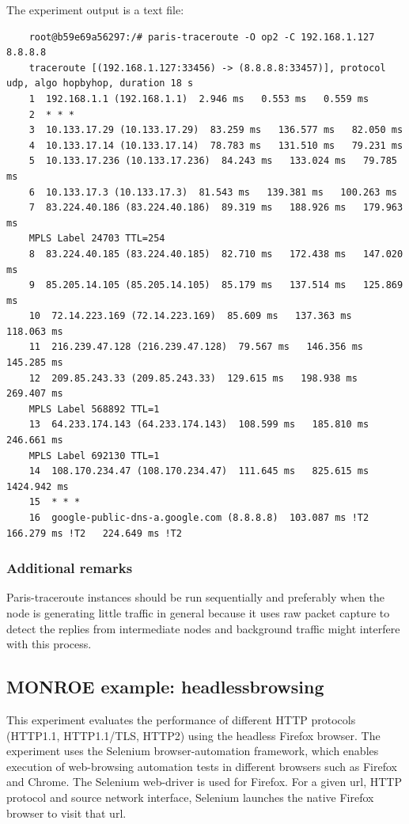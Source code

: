 \documentclass[a4paper,10pt]{article}
\newcommand{\VerbatimFont}{\footnotesize}
\newcommand{\monroe}{MONROE}
\begin{document}
The experiment output is a text file:

{\VerbatimFont
	\begin{verbatim}
	root@b59e69a56297:/# paris-traceroute -O op2 -C 192.168.1.127 8.8.8.8
	traceroute [(192.168.1.127:33456) -> (8.8.8.8:33457)], protocol udp, algo hopbyhop, duration 18 s
	1  192.168.1.1 (192.168.1.1)  2.946 ms   0.553 ms   0.559 ms 
	2  * * *
	3  10.133.17.29 (10.133.17.29)  83.259 ms   136.577 ms   82.050 ms 
	4  10.133.17.14 (10.133.17.14)  78.783 ms   131.510 ms   79.231 ms 
	5  10.133.17.236 (10.133.17.236)  84.243 ms   133.024 ms   79.785 ms 
	6  10.133.17.3 (10.133.17.3)  81.543 ms   139.381 ms   100.263 ms 
	7  83.224.40.186 (83.224.40.186)  89.319 ms   188.926 ms   179.963 ms 
	MPLS Label 24703 TTL=254
	8  83.224.40.185 (83.224.40.185)  82.710 ms   172.438 ms   147.020 ms 
	9  85.205.14.105 (85.205.14.105)  85.179 ms   137.514 ms   125.869 ms 
	10  72.14.223.169 (72.14.223.169)  85.609 ms   137.363 ms   118.063 ms 
	11  216.239.47.128 (216.239.47.128)  79.567 ms   146.356 ms   145.285 ms 
	12  209.85.243.33 (209.85.243.33)  129.615 ms   198.938 ms   269.407 ms 
	MPLS Label 568892 TTL=1
	13  64.233.174.143 (64.233.174.143)  108.599 ms   185.810 ms   246.661 ms 
	MPLS Label 692130 TTL=1
	14  108.170.234.47 (108.170.234.47)  111.645 ms   825.615 ms   1424.942 ms 
	15  * * *
	16  google-public-dns-a.google.com (8.8.8.8)  103.087 ms !T2   166.279 ms !T2   224.649 ms !T2 
	\end{verbatim}
}


\subsubsection{Additional remarks}

Paris-traceroute instances should be run sequentially and preferably when the node is generating little traffic in general because it uses raw packet capture to detect the replies from intermediate nodes and background traffic might interfere with this process.


\subsection{\monroe{} example: headlessbrowsing}

This experiment evaluates the performance of different HTTP protocols (HTTP1.1, HTTP1.1/TLS, HTTP2) using the headless Firefox browser.
The experiment uses the Selenium browser-automation framework, which enables execution of web-browsing automation tests in different browsers such as Firefox and Chrome.
The Selenium web-driver is used for Firefox.
For a given url, HTTP protocol and source network interface, Selenium launches the native Firefox browser to visit that url.
\end{document}
